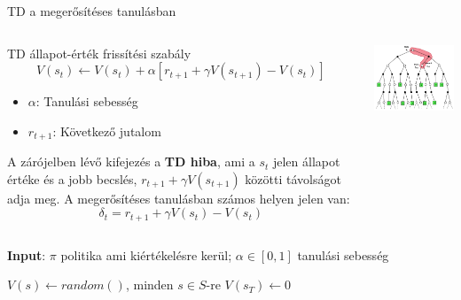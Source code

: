 \documentclass[english, aspectratio=169]{beamer}
\begin{document}
\begin{frame}{TD a megerősítéses tanulásban}
\begin{columns}
\begin{column}{.55\textwidth}
\begin{block}{TD állapot-érték frissítési szabály}
\[
V(s_t) \leftarrow V(s_t) + \alpha \left[ r_{t+1} + \gamma V(s_{t+1}) - V(s_t) \right]
\]
\vspace{-0.5cm}
\begin{itemize}
	\item $\alpha$: Tanulási sebesség
	\item $r_{t+1}$: Következő jutalom 
\end{itemize}
\end{block}
A zárójelben lévő kifejezés a \textbf{TD hiba}, ami a $s_t$ jelen állapot értéke és a jobb becslés, $r_{t+1} + \gamma V(s_{t+1})$ közötti távolságot adja meg. A megerősítéses tanulásban számos helyen jelen van: 
\[
\delta_t=r_{t+1} + \gamma V(s_{t}) - V(s_t)
\]
\end{column}
\begin{column}{.5\textwidth}
\begin{center}
\includegraphics[width=7cm, keepaspectratio]{images/mc_td_8.png}
\end{center}
\end{column}
\end{columns}
\end{frame}

\begin{frame}{}
\begin{algorithm}[H]
\caption{TD algoritmus $v_\pi$ megbecslésére}
\SetAlgoLined
\textbf{Input}: $\pi$ politika ami kiértékelésre kerül; $\alpha \in [0,1]$ tanulási sebesség\par\smallskip
$V(s) \leftarrow random()$, minden $s \in S$-re
$V(s_T) \leftarrow 0$
\end{algorithm}
\end{frame}
\end{document}
